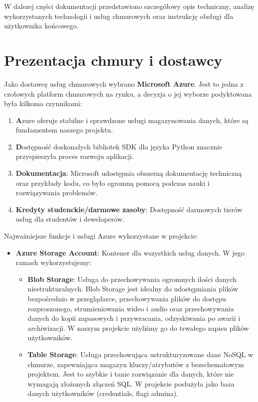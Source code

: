 \documentclass[12pt,a4paper]{article}
\begin{document}
	W dalszej części dokumentacji przedstawiono szczegółowy opis techniczny, analizę wykorzystanych technologii i usług chmurowych oraz instrukcję obsługi dla użytkownika końcowego.
	
	\newpage
	\section{Prezentacja chmury i dostawcy}
	Jako dostawcę usług chmurowych wybrano \textbf{Microsoft Azure}. Jest to jedna z czołowych platform chmurowych na rynku, a decyzja o jej wyborze podyktowana była kilkoma czynnikami:
	\begin{enumerate}
		\item \textbf Azure oferuje stabilne i sprawdzone usługi magazynowania danych, które są fundamentem naszego projektu.
		\item \textbf Dostępność doskonałych bibliotek SDK dla języka Python znacznie przyspieszyła proces rozwoju aplikacji.
		\item \textbf{Dokumentacja}: Microsoft udostępnia obszerną dokumentację techniczną oraz przykłady kodu, co było ogromną pomocą podczas nauki i rozwiązywania problemów.
		\item \textbf{Kredyty studenckie/darmowe zasoby}: Dostępność darmowych tierów usług dla studentów i deweloperów.
	\end{enumerate}
	
	Najważniejsze funkcje i usługi Azure wykorzystane w projekcie:
	\begin{itemize}
		\item \textbf{Azure Storage Account}: Kontener dla wszystkich usług danych. W jego ramach wykorzystujemy:
		\begin{itemize}
			\item \textbf{Blob Storage}: Usługa do przechowywania ogromnych ilości danych niestrukturalnych. Blob Storage jest idealny do udostępniania plików bezpośrednio w przeglądarce, przechowywania plików do dostępu rozproszonego, strumieniowania wideo i audio oraz przechowywania danych do kopii zapasowych i przywracania, odzyskiwania po awarii i archiwizacji. W naszym projekcie użyliśmy go do trwałego zapisu plików użytkowników.
			\item \textbf{Table Storage}: Usługa przechowująca ustrukturyzowane dane NoSQL w chmurze, zapewniająca magazyn kluczy/atrybutów z bezschematowym projektem. Jest to szybkie i tanie rozwiązanie dla danych, które nie wymagają złożonych złączeń SQL. W projekcie posłużyła jako baza danych użytkowników (credentials, flagi admina).
		\end{itemize}
	\end{itemize}
	
\end{document}
